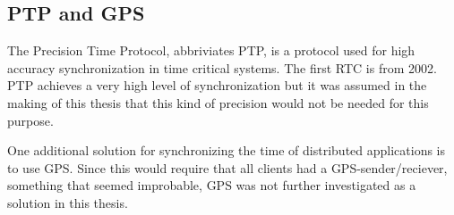 \subsection{PTP and GPS}

The Precision Time Protocol, abbriviates PTP, is a protocol used for high accuracy synchronization in time critical systems. The first RTC is from 2002. PTP achieves a very high level of synchronization but it was assumed in the making of this thesis that this kind of precision would not be needed for this purpose. 

One additional solution for synchronizing the time of distributed applications is to use GPS. Since this would require that all clients had a GPS-sender/reciever, something that seemed improbable, GPS was not further investigated as a solution in this thesis. 
